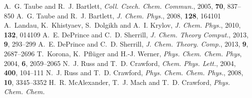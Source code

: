\documentclass[11pt,article]{achemso}
\begin{document}
\begin{mcitethebibliography}{41}
\EndOfBibitem
{}
A.~G. Taube and R.~J. Bartlett, \emph{Coll. Czech. Chem. Commun.}, 2005,
  \textbf{70}, 837--850\relax
\mciteBstWouldAddEndPuncttrue
\mciteSetBstMidEndSepPunct{\mcitedefaultmidpunct}
{\mcitedefaultendpunct}{\mcitedefaultseppunct}\relax
\EndOfBibitem
{}
A.~G. Taube and R.~J. Bartlett, \emph{J. Chem. Phys.}, 2008, \textbf{128},
  164101\relax
\mciteBstWouldAddEndPuncttrue
\mciteSetBstMidEndSepPunct{\mcitedefaultmidpunct}
{\mcitedefaultendpunct}{\mcitedefaultseppunct}\relax
\EndOfBibitem
{}
A.~Landau, K.~Khistyaev, S.~Dolgikh and A.~I. Krylov, \emph{J. Chem. Phys.},
  2010, \textbf{132}, 014109\relax
\mciteBstWouldAddEndPuncttrue
\mciteSetBstMidEndSepPunct{\mcitedefaultmidpunct}
{\mcitedefaultendpunct}{\mcitedefaultseppunct}\relax
\EndOfBibitem
{}
A.~E. DePrince and C.~D. Sherrill, \emph{J. Chem. Theory Comput.}, 2013,
  \textbf{9}, 293--299\relax
\mciteBstWouldAddEndPuncttrue
\mciteSetBstMidEndSepPunct{\mcitedefaultmidpunct}
{\mcitedefaultendpunct}{\mcitedefaultseppunct}\relax
\EndOfBibitem
{}
A.~E. DePrince and C.~D. Sherrill, \emph{J. Chem. Theory. Comp.}, 2013,
  \textbf{9}, 2687--2696\relax
\mciteBstWouldAddEndPuncttrue
\mciteSetBstMidEndSepPunct{\mcitedefaultmidpunct}
{\mcitedefaultendpunct}{\mcitedefaultseppunct}\relax
\EndOfBibitem
{}
T.~Korona, K.~Pfl{\"u}ger and H.-J. Werner, \emph{Phys. Chem. Chem. Phys},
  2004, \textbf{6}, 2059--2065\relax
\mciteBstWouldAddEndPuncttrue
\mciteSetBstMidEndSepPunct{\mcitedefaultmidpunct}
{\mcitedefaultendpunct}{\mcitedefaultseppunct}\relax
\EndOfBibitem
{}
N.~J. Russ and T.~D. Crawford, \emph{Chem. Phys. Lett.}, 2004, \textbf{400},
  104--111\relax
\mciteBstWouldAddEndPuncttrue
\mciteSetBstMidEndSepPunct{\mcitedefaultmidpunct}
{\mcitedefaultendpunct}{\mcitedefaultseppunct}\relax
\EndOfBibitem
{}
N.~J. Russ and T.~D. Crawford, \emph{Phys. Chem. Chem. Phys.}, 2008,
  \textbf{10}, 3345--3352\relax
\mciteBstWouldAddEndPuncttrue
\mciteSetBstMidEndSepPunct{\mcitedefaultmidpunct}
{\mcitedefaultendpunct}{\mcitedefaultseppunct}\relax
\EndOfBibitem
{}
H.~R. McAlexander, T.~J. Mach and T.~D. Crawford, \emph{Phys. Chem. Chem.
}
\end{mcitethebibliography}
\end{document}
